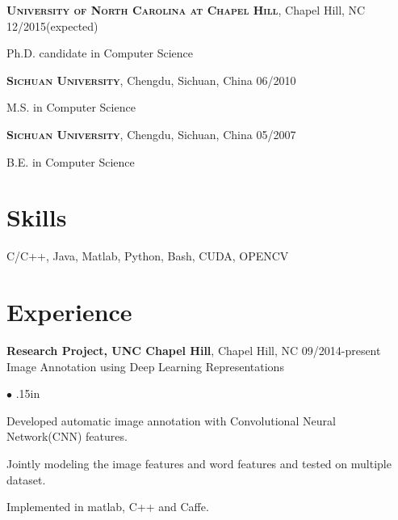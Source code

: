 \documentclass[line,margin]{res}
\newenvironment{bullets}{\begin{list}{\tiny$\bullet$}{\topsep 0pt \itemsep -2pt \leftmargin .15in}}{\vspace*{4pt}\end{list}}
\newenvironment{list1}{
  \begin{list}{\ding{113}}{%
      \setlength{\itemsep}{0in}
      \setlength{\parsep}{0in} \setlength{\parskip}{0in}
      \setlength{\topsep}{0in} \setlength{\partopsep}{0in} 
      \setlength{\leftmargin}{0.17in}}}{\end{list}}
\begin{document}
\begin{resume}
\textsc{\textbf{University of North Carolina at Chapel Hill}}, Chapel Hill, NC \hfill{12/2015(expected)}\\
\vspace*{-.15in}
\begin{list1}
\item[] Ph.D. candidate in Computer Science %
\end{list1}
\vspace*{-.15in}
\textsc{\textbf{Sichuan University}}, Chengdu, Sichuan, China \hfill {06/2010} \\
\vspace*{-.15in}
\begin{list1}
\item[] M.S. in Computer Science  %
\end{list1}
\vspace*{-.15in}
\textsc{\textbf{Sichuan University}}, Chengdu, Sichuan, China \hfill{05/2007}\\
\vspace*{-.15in}
\begin{list1}
\item[] B.E. in Computer Science  %
\end{list1}

\section{\sc Skills}
\smallskip

C/C++, Java, Matlab, Python, Bash, CUDA, OPENCV


\vspace{-.05in}
\section{\sc Experience}
\smallskip

\textbf{Research Project, UNC Chapel Hill}, Chapel Hill, NC  \hfill      09/2014-present \\
Image Annotation using Deep Learning Representations%
\begin{bullets}
	\item Developed automatic image annotation with Convolutional Neural Network(CNN) features.
	\item Jointly modeling the image features and word features and tested on multiple dataset.
	\item Implemented in matlab, C++ and Caffe.
\end{bullets}
\vspace{-.1in}


\end{resume}
\end{document}
